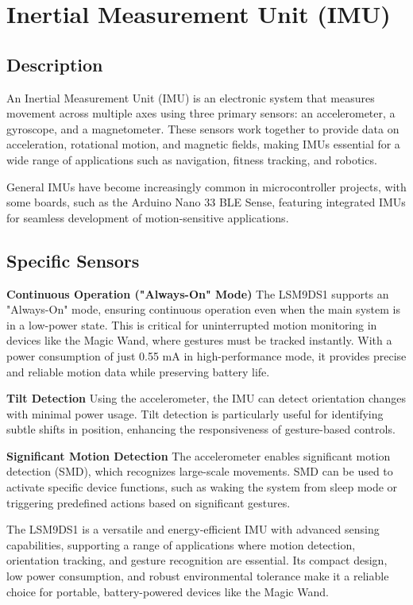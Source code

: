 \pagebreak
\section{Inertial Measurement Unit (IMU)}\label{IMU}

\subsection{Description}
An Inertial Measurement Unit (IMU) is an electronic system that measures movement across multiple axes using three primary sensors: an accelerometer, a gyroscope, and a magnetometer.\cite{Qureshi:2017} These sensors work together to provide data on acceleration, rotational motion, and magnetic fields, making IMUs essential for a wide range of applications such as navigation, fitness tracking, and robotics.\cite{Qureshi:2017}

{General}
IMUs have become increasingly common in microcontroller projects, with some boards, such as the Arduino Nano 33 BLE Sense, featuring integrated IMUs for seamless development of motion-sensitive applications.\cite{Zhou:2020}

\subsection{Specific Sensors}
\textbf{Continuous Operation ("Always-On" Mode)}
The LSM9DS1 supports an "Always-On" mode, ensuring continuous operation even when the main system is in a low-power state.\cite{Zhou:2020} This is critical for uninterrupted motion monitoring in devices like the Magic Wand, where gestures must be tracked instantly. With a power consumption of just 0.55 mA in high-performance mode, it provides precise and reliable motion data while preserving battery life.\cite{Zhou:2020}

\textbf{Tilt Detection}
Using the accelerometer, the IMU can detect orientation changes with minimal power usage. Tilt detection is particularly useful for identifying subtle shifts in position, enhancing the responsiveness of gesture-based controls.\cite{Zhou:2020}

\textbf{Significant Motion Detection}
The accelerometer enables significant motion detection (SMD), which recognizes large-scale movements. SMD can be used to activate specific device functions, such as waking the system from sleep mode or triggering predefined actions based on significant gestures.\cite{Zhou:2020}

The LSM9DS1 is a versatile and energy-efficient IMU with advanced sensing capabilities, supporting a range of applications where motion detection, orientation tracking, and gesture recognition are essential. Its compact design, low power consumption, and robust environmental tolerance make it a reliable choice for portable, battery-powered devices like the Magic Wand.\cite{Zhou:2020}

